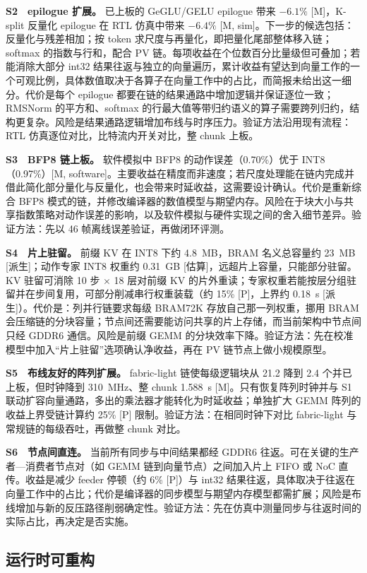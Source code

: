 \documentclass[a4paper,10.5pt]{ctexart}
\newcommand{\tM}{\textsf{[M]}}              %
\newcommand{\tP}{\textsf{[P]}}              %
\newcommand{\tMsim}{\textsf{[M, sim]}}      %
\newcommand{\tMsw}{\textsf{[M, software]}}  %
\newcommand{\tD}{\textsf{[派生]}}           %
\newcommand{\tE}{\textsf{[估算]}}           %
\begin{document}
\textbf{S2　epilogue 扩展。} 已上板的 GeGLU/GELU epilogue 带来 $-6.1\%$ \tM，K-split 反量化 epilogue 在 RTL 仿真中带来 $-6.4\%$ \tMsim。下一步的候选包括：反量化与残差相加；按 token 求尺度与再量化，即把量化尾部整体移入链；softmax 的指数与行和，配合 PV 链。每项收益在个位数百分比量级但可叠加；若能消除大部分 int32 结果往返与独立的向量遍历，累计收益有望达到向量工作的一个可观比例，具体数值取决于各算子在向量工作中的占比，而简报未给出这一细分。代价是每个 epilogue 都要在链的结果通路中增加逻辑并保证逐位一致；RMSNorm 的平方和、softmax 的行最大值等带归约语义的算子需要跨列归约，结构更复杂。风险是结果通路逻辑增加布线与时序压力。验证方法沿用现有流程：RTL 仿真逐位对比，比特流内开关对比，整 chunk 上板。

\textbf{S3　BFP8 链上板。} 软件模拟中 BFP8 的动作误差（0.70\%）优于 INT8（0.97\%）\tMsw。主要收益在精度而非速度；若尺度处理能在链内完成并借此简化部分量化与反量化，也会带来时延收益，这需要设计确认。代价是重新综合 BFP8 模式的链，并修改编译器的数值模型与期望内存。风险在于块大小与共享指数策略对动作误差的影响，以及软件模拟与硬件实现之间的舍入细节差异。验证方法：先以 46 帧离线误差验证，再做闭环评测。

\textbf{S4　片上驻留。} 前缀 KV 在 INT8 下约 4.8~MB，BRAM 名义总容量约 23~MB \tD；动作专家 INT8 权重约 0.31~GB \tE，远超片上容量，只能部分驻留。KV 驻留可消除 10 步 $\times$ 18 层对前缀 KV 的片外重读；专家权重若能按层分组驻留并在步间复用，可部分削减串行权重装载（约 15\% \tP，上界约 0.18~s \tD）。代价是：列并行链要求每级 BRAM72K 存放自己那一列权重，挪用 BRAM 会压缩链的分块容量；节点间还需要能访问共享的片上存储，而当前架构中节点间只经 GDDR6 通信。风险是前缀 GEMM 的分块效率下降。验证方法：先在校准模型中加入“片上驻留”选项确认净收益，再在 PV 链节点上做小规模原型。

\textbf{S5　布线友好的阵列扩展。} fabric-light 链使每级逻辑块从 21.2 降到 2.4 个并已上板，但时钟降到 310~MHz、整 chunk 1.588~s \tM。只有恢复阵列时钟并与 S1 联动扩容向量通路，多出的乘法器才能转化为时延收益；单独扩大 GEMM 阵列的收益上界受链计算约 25\% \tP{} 限制。验证方法：在相同时钟下对比 fabric-light 与常规链的每级吞吐，再做整 chunk 对比。

\textbf{S6　节点间直连。} 当前所有同步与中间结果都经 GDDR6 往返。可在关键的生产者—消费者节点对（如 GEMM 链到向量节点）之间加入片上 FIFO 或 NoC 直传。收益是减少 feeder 停顿（约 6\% \tP）与 int32 结果往返，具体取决于往返在向量工作中的占比；代价是编译器的同步模型与期望内存模型都需扩展；风险是布线增加与新的反压路径削弱确定性。验证方法：先在仿真中测量同步与往返时间的实际占比，再决定是否实施。

\subsection{运行时可重构}
\end{document}
